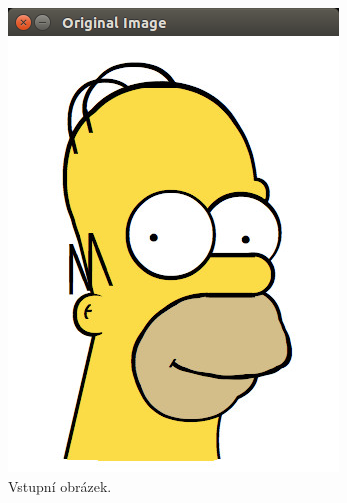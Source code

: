 \documentclass[12pt, a4paper]{article}
\begin{document}
\begin{figure}[!ht]
	\centering
	\begin{minipage}[t]{0.49\textwidth}
		\includegraphics[width = \textwidth]{./original.png}
		\caption{Vstupní obrázek.}
	\end{minipage}%
	\hfill
	\begin{minipage}[t]{0.49\textwidth}

\end{minipage}
\end{figure}
\end{document}
